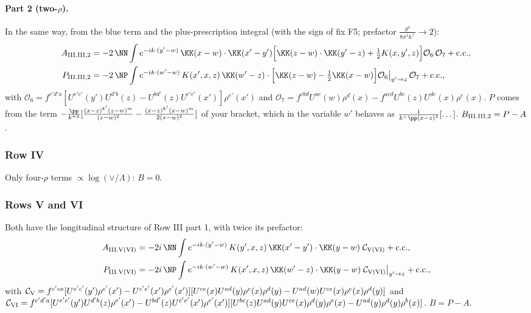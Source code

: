 \paragraph{Part 2 (two-$\rho$).} In the same way, from the blue term and the plus-prescription integral (with the sign of fix F5; prefactor $\frac{g^4}{8\pi^5k^+}\to2$):
\begin{align}
A_{\rm III.III,2}&=-2\,\NN\int e^{-ik\cdot(y'-w)}\,\KK(x-w)\cdot\KK(x'-y')\Big[\KK(z-w)\cdot\KK(y'-z)+\tfrac12K(x,y',z)\Big]\mathcal O_6\,\mathcal O_7+{\rm c.c.},\notag\\
P_{\rm III.III,2}&=-2\,\NP\int e^{-ik\cdot(w'-w)}\,K(x',x,z)\,\KK(w'-z)\cdot\Big[\KK(z-w)-\tfrac12\KK(x-w)\Big]\mathcal O_6\big|_{y'\to z}\,\mathcal O_7+{\rm c.c.},
\end{align}
with $\mathcal O_6=f^{c'd'a}[U^{e'c'}(y')U^{d'b}(z)-U^{bd'}(z)U^{c'e'}(x')]\rho^{e'}(x')$ and $\mathcal O_7=f^{cbd}U^{ac}(w)\rho^d(x)-f^{acd}U^{bc}(z)U^{de}(x)\rho^e(x)$. $P$ comes from the term $-\frac{\pp}{k^{+2}}[\frac{(x-z)^{k'}(z-w)^m}{(z-w)^2}-\frac{(x-z)^{k'}(x-w)^m}{2(x-w)^2}]$ of your bracket, which in the variable $w'$ behaves as $\frac{1}{k^+\pp(x-z)^2}[\dots]$. $B_{\rm III.III,2}=P-A$.

\subsubsection{Row IV}
Only four-$\rho$ terms $\propto\log(\vee/\Lambda)$: \textbf{$B=0$}.

\subsubsection{Rows V and VI}
Both have the longitudinal structure of Row III part 1, with twice its prefactor:
\begin{align}
A_{\rm III.V(VI)}&=-2i\,\NN\int e^{-ik\cdot(y'-w)}\,K(y',x,z)\,\KK(x'-y')\cdot\KK(y-w)\;\mathcal C_{\rm V(VI)}+{\rm c.c.},\notag\\
P_{\rm III.V(VI)}&=-2i\,\NP\int e^{-ik\cdot(w'-w)}\,K(x',x,z)\,\KK(w'-z)\cdot\KK(y-w)\;\mathcal C_{\rm V(VI)}\big|_{y'\to z}+{\rm c.c.},
\end{align}
with $\mathcal C_{\rm V}=f^{c'ca}[U^{e'c'}(y')\rho^{e'}(x')-U^{c'e'}(x')\rho^{e'}(x')][U^{ce}(x)U^{ad}(y)\rho^e(x)\rho^d(y)-U^{ad}(w)U^{ce}(x)\rho^e(x)\rho^d(y)]$ and $\mathcal C_{\rm VI}=f^{c'd'a}[U^{e'c'}(y')U^{d'b}(z)\rho^{e'}(x')-U^{bd'}(z)U^{c'e'}(x')\rho^{e'}(x')][U^{bc}(z)U^{ad}(y)U^{ce}(x)\rho^d(y)\rho^e(x)-U^{ad}(y)\rho^d(y)\rho^b(x)]$. $B=P-A$.

